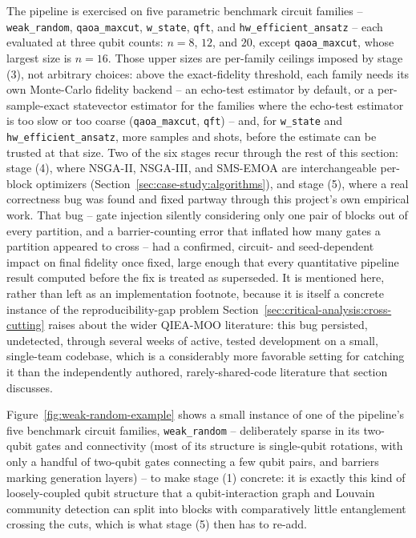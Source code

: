 The pipeline is exercised on five parametric benchmark circuit families
-- \texttt{weak\_random}, \texttt{qaoa\_maxcut}, \texttt{w\_state},
\texttt{qft}, and \texttt{hw\_efficient\_ansatz} -- each evaluated at
three qubit counts: $n{=}8$, $12$, and $20$, except
\texttt{qaoa\_maxcut}, whose largest size is $n{=}16$. Those upper
sizes are per-family ceilings imposed by stage (3), not arbitrary
choices: above the exact-fidelity threshold, each family needs its own
Monte-Carlo fidelity backend -- an echo-test estimator by default, or a
per-sample-exact statevector estimator for the families where the
echo-test estimator is too slow or too coarse (\texttt{qaoa\_maxcut},
\texttt{qft}) -- and, for \texttt{w\_state} and
\texttt{hw\_efficient\_ansatz}, more samples and shots, before the estimate can be trusted at
that size. Two of the six stages recur through the rest of this
section: stage (4), where NSGA-II, NSGA-III, and SMS-EMOA are
interchangeable per-block optimizers (Section~\ref{sec:case-study:algorithms}),
and stage (5), where a real correctness bug was found and fixed partway
through this project's own empirical work. That bug -- gate injection
silently considering only one pair of blocks out of every partition,
and a barrier-counting error that inflated how many gates a partition
appeared to cross -- had a confirmed, circuit- and seed-dependent impact
on final fidelity once fixed, large enough that every quantitative
pipeline result computed before the fix is treated as superseded. It is
mentioned here, rather than left as an implementation footnote, because
it is itself a concrete instance of the reproducibility-gap problem
Section~\ref{sec:critical-analysis:cross-cutting} raises about the wider
QIEA-MOO literature: this bug persisted, undetected, through several
weeks of active, tested development on a small, single-team codebase,
which is a considerably more favorable setting for catching it than the
independently authored, rarely-shared-code literature that section
discusses.

Figure~\ref{fig:weak-random-example} shows a small instance of one of
the pipeline's five benchmark circuit families,
\texttt{weak\_random} -- deliberately sparse in its two-qubit gates and
connectivity (most of its structure is single-qubit rotations, with
only a handful of two-qubit gates connecting a few qubit pairs, and
barriers marking generation layers) -- to make stage (1) concrete: it
is exactly this kind of loosely-coupled qubit structure that a
qubit-interaction graph and Louvain community detection can split into
blocks with comparatively little entanglement crossing the cuts, which
is what stage (5) then has to re-add.

